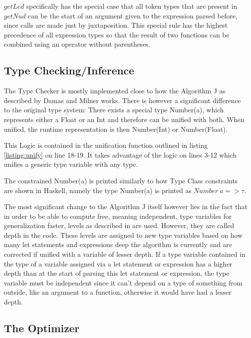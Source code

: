 \documentclass[12pt]{article}
\newcommand{\importListing}[1]{
    \begin{minipage}{\linewidth}
    
    \end{minipage}
}
\begin{document}
$getLed$ specifically has the special case that all token types that are present in $getNud$
can be the start of an argument given to the expression parsed before, since calls are
made just by juxtaposition. This special rule has the highest precedence of all expression types
so that the result of two functions can be combined using an operator without parentheses.

\subsection{Type Checking/Inference}
The Type Checker is mostly implemented close to how the Algorithm J as described
by Damas and Milner\autocite{damasPrincipalTypeschemesFunctional1982} works.
There is however a significant difference to the original type system:
There exists a special type Number(a), which represents either a Float or an Int
and therefore can be unified with both. When unified, the runtime representation
is then Number(Int) or Number(Float).

\importListing{code/unify.tex}

This Logic is contained in the unification function outlined
in listing \ref{listing:unify} on line 18-19. It takes advantage of the logic
on lines 3-12 which unifies a generic type variable with any type.

The constrained Number(a) is printed similarly to how Type Class
constraints are shown in Haskell, namely the type Number(a) is printed as
$Number\:a => \tau$.

The most significant change to the Algorithm J itself however
lies in the fact that in order to be able
to compute free, meaning independent, type variables for generalization
faster, levels as described in \autocite{EfficientInsightfulGeneralization2022} are
used. However, they are called depth in the code.
These levels are assigned to new type variables based on how many let statements and expressions
deep the algorithm is currently and are corrected if unified with a variable of lesser depth.
If a type variable contained in the type of a variable assigned via a let statement or expression
has a higher depth than at the start of parsing this let statement or expression, the type variable must be
independent since it can't depend on a type of something from outside, like an argument to a function, otherwise
it would have had a lesser depth.

\subsection{The Optimizer}
\importListing{code/optimizer.tex}
\end{document}
